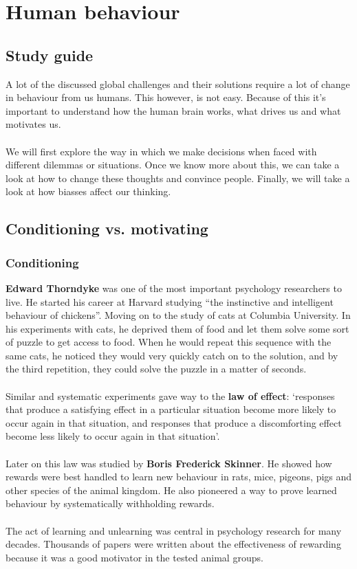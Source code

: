 \documentclass[../summary.tex]{subfiles}
\begin{document}
\section{Human behaviour}

\subsection{Study guide}
A lot of the discussed global challenges and their solutions require a lot of change in behaviour from us humans. This however, is not easy. Because of this it's important to understand how the human brain works, what drives us and what motivates us.
\\\\
We will first explore the way in which we make decisions when faced with different dilemmas or situations. Once we know more about this, we can take a look at how to change these thoughts and convince people. Finally, we will take a look at how biasses affect our thinking.
\subsection{Conditioning vs. motivating}
\subsubsection{Conditioning}
\textbf{Edward Thorndyke} was one of the most important psychology researchers to live. He started his career at Harvard studying ``the instinctive and intelligent behaviour of chickens''. Moving on to the study of cats at Columbia University. In his experiments with cats, he deprived them of food and let them solve some sort of puzzle to get access to food. When he would repeat this sequence with the same cats, he noticed they would very quickly catch on to the solution, and by the third repetition, they could solve the puzzle in a matter of seconds.
\\\\
Similar and systematic experiments gave way to the \textbf{law of effect}: `responses that produce a satisfying effect in a particular situation become more likely to occur again in that situation, and responses that produce a discomforting effect become less likely to occur again in that situation'.
\\\\
Later on this law was studied by \textbf{Boris Frederick Skinner}. He showed how rewards were best handled to learn new behaviour in rats, mice, pigeons, pigs and other species of the animal kingdom. He also pioneered a way to prove learned behaviour by systematically withholding rewards.
\\\\
The act of learning and unlearning was central in psychology research for many decades. Thousands of papers were written about the effectiveness of rewarding because it was a good motivator in the tested animal groups.
\end{document}
